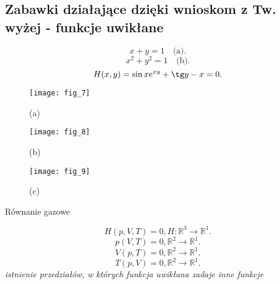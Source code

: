 \documentclass[../main.tex]{subfiles}
\begin{document}
    \subsection{Zabawki działające dzięki wnioskom z Tw. wyżej - funkcje uwikłane}

\[
    x+y=1 \quad\text{(a)}
.\]
\[
    x^2+y^2=1 \quad\text{(b)}
.\]
\[
    H(x,y) = \sin x e^{xy}+ \tg y - x = 0
.\]


\vspace{2cm}

\begin{figure}
    \centering
    \texttt{[image: fig\_7]}
    \caption{(a)}
\end{figure}
\begin{figure}
    \centering
    \texttt{[image: fig\_8]}
    \caption{(b)}
\end{figure}
\begin{figure}
    \centering
    \texttt{[image: fig\_9]}
    \caption{(c)}
\end{figure}


\vspace{1cm}

\begin{przyklad}
    Równanie gazowe
\end{przyklad}
    \[
        H(p,V,T) = 0, H: \mathbb{R}^{3} \to \mathbb{R}^{1}
    .\]
    \[
        p(V,T) = 0, \mathbb{R}^{2}\to\mathbb{R}^{1}
    .\]
    \[
        V(p,T) = 0, \mathbb{R}^{2}\to\mathbb{R}^{1}
    .\]
    \[
        T(p,V) = 0, \mathbb{R}^{2}\to\mathbb{R}^{1}
    .\]
    \textit{istnienie przedziałów, w których funkcja uwikłana zadaje inne funkcje}
\end{document}
